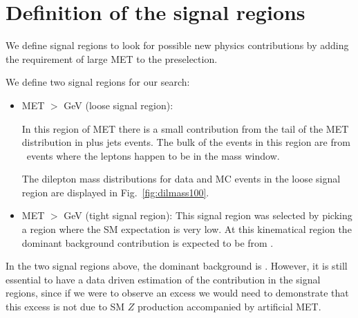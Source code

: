 \section{Definition of the signal regions}
\label{sec:sigregion}

We define signal regions to look for possible
new physics contributions by adding the requirement of large MET to the preselection. 

We define two signal regions for our search:
\begin{itemize}
\item MET $>$ \signalmetl GeV (loose signal region):

In this region of MET there is a small contribution from the tail of the MET distribution 
in \Z plus jets events. 
The bulk of the events in this region are from \ttbar\ events where the leptons happen to be in the \Z 
mass window.

The dilepton mass distributions for data and MC events in the loose signal region are displayed in Fig.~\ref{fig:dilmass100}.

\item MET $>$ \signalmett GeV (tight signal region):
This signal region was selected by picking a region where the SM expectation is very low.
At this kinematical region the dominant background contribution is expected to be from \ttbar.

\end{itemize}

In the two signal regions above, the dominant background is \ttbar. 
However, it is still essential to have a data driven estimation of the \Z contribution
in the signal regions, since if we were to observe an excess we would need to demonstrate
that this excess is not due to SM $Z$ production accompanied by artificial MET.

